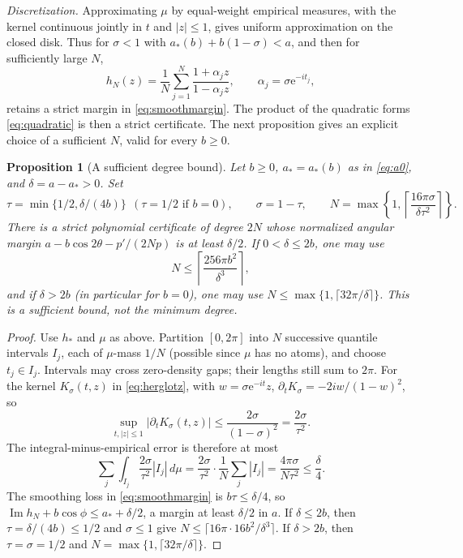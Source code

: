 \documentclass[11pt]{article}
\newtheorem{proposition}[theorem]{Proposition}
\theoremstyle{remark}\newtheorem{remark}[theorem]{Remark}
\newcommand{\Ima}{\operatorname{Im}}
\newcommand{\ee}{\mathrm e}
\begin{document}
\emph{Discretization.} Approximating \(\mu\) by equal-weight empirical
measures, with the kernel continuous jointly in \(t\) and
\(|z|\le1\), gives uniform approximation on the closed disk. Thus
for \(\sigma<1\) with \(a_*(b)+b(1-\sigma)<a\), and then for
sufficiently large \(N\),
\[
 h_N(z)=\frac1N\sum_{j=1}^N
        \frac{1+\alpha_jz}{1-\alpha_jz},
 \qquad \alpha_j=\sigma\ee^{-it_j},
\]
retains a strict margin in \eqref{eq:smoothmargin}. The product of the
quadratic forms \eqref{eq:quadratic} is
then a strict certificate. The next proposition gives an explicit
choice of a sufficient \(N\), valid for every \(b\ge0\).

\begin{proposition}[A sufficient degree bound]\label{prop:degree}
Let \(b\ge0\), \(a_*=a_*(b)\) as in \eqref{eq:a0}, and
\(\delta=a-a_*>0\). Set
\[
 \tau=\min\{1/2,\delta/(4b)\}\ \ (\tau=1/2\text{ if }b=0),\qquad
 \sigma=1-\tau,\qquad
 N=\max\left\{1,\left\lceil
                  \frac{16\pi\sigma}{\delta\tau^2}
                    \right\rceil\right\}.
\]
There is a strict polynomial certificate of degree \(2N\)
whose normalized angular margin
\(a-b\cos2\theta-p'/(2Np)\) is at least \(\delta/2\).
If \(0<\delta\le2b\), one may use
\[
 N\le\left\lceil\frac{256\pi b^2}{\delta^3}\right\rceil,
\]
and if \(\delta>2b\) (in particular for \(b=0\)), one may use
\(N\le\max\{1,\lceil32\pi/\delta\rceil\}\).
This is a sufficient bound, not the minimum degree.
\end{proposition}
\begin{proof}
Use \(h_*\) and \(\mu\) as above. Partition \([0,2\pi]\) into \(N\)
successive quantile intervals
\(I_j\), each of \(\mu\)-mass \(1/N\) (possible since \(\mu\) has no
atoms), and choose \(t_j\in I_j\).
Intervals may cross zero-density gaps; their lengths still sum
to \(2\pi\).
For the kernel \(K_\sigma(t,z)\) in \eqref{eq:herglotz}, with
\(w=\sigma\ee^{-it}z\), \(\partial_tK_\sigma=-2iw/(1-w)^2\), so
\[
 \sup_{t,|z|\le1}|\partial_tK_\sigma(t,z)|
       \le\frac{2\sigma}{(1-\sigma)^2}=\frac{2\sigma}{\tau^2}.
\]
The integral-minus-empirical error is therefore at most
\[
 \sum_j\int_{I_j}\frac{2\sigma}{\tau^2}|I_j|\,d\mu
       =\frac{2\sigma}{\tau^2}\cdot\frac1N\sum_j|I_j|
       =\frac{4\pi\sigma}{N\tau^2}\le\frac\delta4.
\]
The smoothing loss in \eqref{eq:smoothmargin} is \(b\tau\le\delta/4\),
so \(\Ima h_N+b\cos\phi\le a_*+\delta/2\), a margin at least
\(\delta/2\) in \(a\). If \(\delta\le2b\), then \(\tau=\delta/(4b)\le1/2\) and
\(\sigma\le1\) give
\(N\le\lceil16\pi\cdot16b^2/\delta^3\rceil\). If \(\delta>2b\), then
\(\tau=\sigma=1/2\) and \(N=\max\{1,\lceil32\pi/\delta\rceil\}\).
\end{proof}
\end{document}
